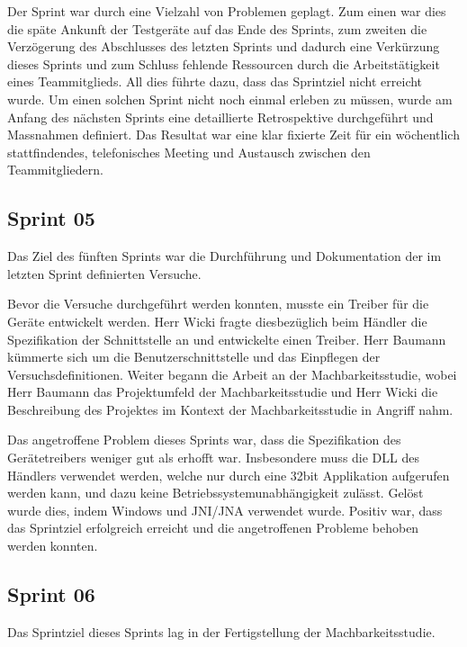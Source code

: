 Der Sprint war durch eine Vielzahl von Problemen geplagt. Zum einen war dies die späte Ankunft der Testgeräte auf das Ende des Sprints, zum zweiten die Verzögerung des Abschlusses des letzten Sprints und dadurch eine Verkürzung dieses Sprints und zum Schluss fehlende Ressourcen durch die Arbeitstätigkeit eines Teammitglieds. All dies führte dazu, dass das Sprintziel nicht erreicht wurde. Um einen solchen Sprint nicht noch einmal erleben zu müssen, wurde am Anfang des nächsten Sprints eine detaillierte Retrospektive durchgeführt und Massnahmen definiert. Das Resultat war eine klar fixierte Zeit für ein wöchentlich stattfindendes, telefonisches Meeting und Austausch zwischen den Teammitgliedern.

\subsection{Sprint 05}
Das Ziel des fünften Sprints war die Durchführung und Dokumentation der im letzten Sprint definierten Versuche.

Bevor die Versuche durchgeführt werden konnten, musste ein Treiber für die Geräte entwickelt werden. Herr Wicki fragte diesbezüglich beim Händler die Spezifikation der Schnittstelle an und entwickelte einen Treiber. Herr Baumann kümmerte sich um die Benutzerschnittstelle und das Einpflegen der Versuchsdefinitionen. Weiter begann die Arbeit an der Machbarkeitsstudie, wobei Herr Baumann das Projektumfeld der Machbarkeitsstudie und Herr Wicki die Beschreibung des Projektes im Kontext der Machbarkeitsstudie in Angriff nahm.

Das angetroffene Problem dieses Sprints war, dass die Spezifikation des Gerätetreibers weniger gut als erhofft war. Insbesondere muss die DLL des Händlers verwendet werden, welche nur durch eine 32bit Applikation aufgerufen werden kann, und dazu keine Betriebssystemunabhängigkeit zulässt. Gelöst wurde dies, indem Windows und JNI/JNA verwendet wurde. Positiv war, dass das Sprintziel erfolgreich erreicht und die angetroffenen Probleme behoben werden konnten.

\subsection{Sprint 06}
Das Sprintziel dieses Sprints lag in der Fertigstellung der Machbarkeitsstudie.

